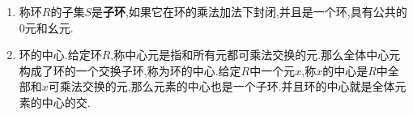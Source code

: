 \begin{enumerate}
\begin{proof}
		第四步,利用类方程证明$n=1$,从而$R=C$是域完成证明.首先,我们断言分圆多项式$\Omega_n(x)$满足$\Omega_n(q)\mid\frac{q^n-1}{q^d-1}$,其中$d\mid n$,$d<n$.按照$q^n-1=\prod_{1\le d\mid n}\Omega_d(q)$,$q^d-1=\prod_{1\le i\mid d}\Omega_i(q)$,得到$\frac{q^n-1}{q^d-1}=\prod_{1\le i\mid n,i\not\mid d}\Omega_i(q)$,特别的,$\Omega_n(q)\mid\frac{q^n-1}{q^d-1}$.于是按照类方程,得到$\Omega_n(q)\mid q-1$,于是$\Omega_n(q)\le q-1$.但是$\Omega_n(q)$是$\varphi(n)$个$q-\xi$的乘积,这里$\xi$是一个本原$n$次单位根,导致$|q-\xi|\ge|q|-|\xi|=q-1$,于是$\Omega_n(q)\ge q-1$,于是满足整除条件只能有$n=1$,完成证明.
	\end{proof}
	\item 称环$R$的子集$S$是\textbf{子环},如果它在环的乘法加法下封闭,并且是一个环,具有公共的0元和幺元.
	\item 环的中心.给定环$R$,称中心元是指和所有元都可乘法交换的元.那么全体中心元构成了环的一个交换子环,称为环的中心.给定$R$中一个元$x$,称$x$的中心是$R$中全部和$x$可乘法交换的元,那么元素的中心也是一个子环.并且环的中心就是全体元素的中心的交.
\end{enumerate}

